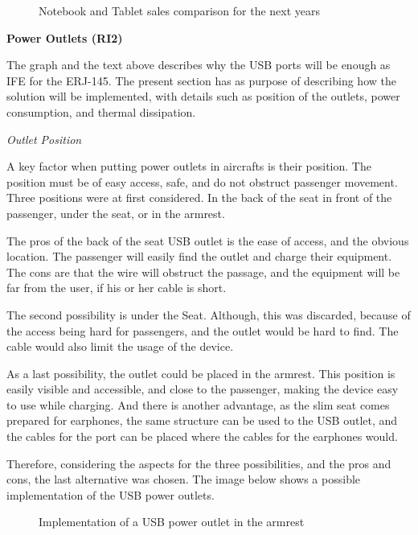 \begin{figure}[H] %
\caption{Notebook and Tablet sales comparison for the next years}
\label{fig:tabletvsnotebook}
\end{figure}

\textbf{Power Outlets (RI2)}

The graph and the text above describes why the USB ports will be enough as IFE for the ERJ-145. The present section has as purpose of describing how the solution will be implemented, with details such as position of the outlets, power consumption, and thermal dissipation.

\textit{Outlet Position}

A key factor when putting power outlets in aircrafts is their position. The position must be of easy access, safe, and do not obstruct passenger movement. Three positions were at first considered. In the back of the seat in front of the passenger, under the seat, or in the armrest.

The pros of the back of the seat USB outlet is the ease of access, and the obvious location. The passenger will easily find the outlet and charge their equipment. The cons are that the wire will obstruct the passage, and the equipment will be far from the user, if his or her cable is short.

The second possibility is under the Seat. Although, this was discarded, because of the access being hard for passengers, and the outlet would be hard to find. The cable would also limit the usage of the device.

As a last possibility, the outlet could be placed in the armrest. This position is easily visible and accessible, and close to the passenger, making the device easy to use while charging. And there is another advantage, as the slim seat comes prepared for earphones, the same structure can be used to the USB outlet, and the cables for the port can be placed where the cables for the earphones would.

Therefore, considering the aspects for the three possibilities, and the pros and cons, the last alternative was chosen. The image below shows a possible implementation of the USB power outlets.



\begin{figure}[H] %
\caption{Implementation of a USB power outlet in the armrest}
\label{fig:usbpoweroutlet}
\end{figure}

